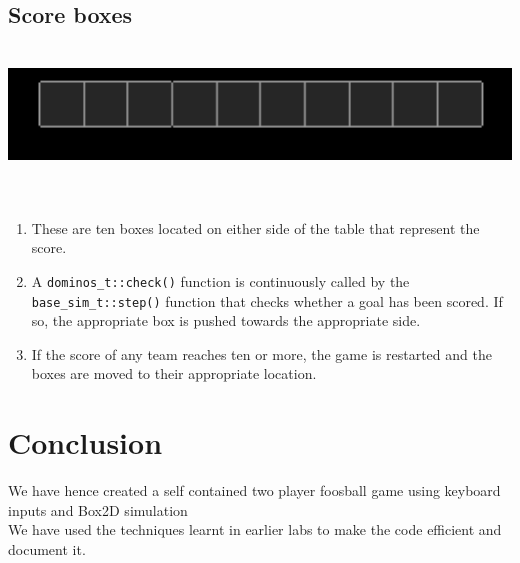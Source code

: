 \documentclass{article}
\begin{document}
\subsection{Score boxes}
\begin{center}
\includegraphics[width=400pt,height=100pt]{Scores}~\\
\end{center}
\begin{enumerate}
\item These are ten boxes located on either side of the table that represent the score.
\item A \texttt{dominos\_t::check()} function is continuously called by the \texttt{base\_sim\_t::step()} function that checks whether a goal has been scored. If so, the appropriate box is pushed towards the appropriate side.
\item If the score of any team reaches ten or more, the game is restarted and the boxes are moved to their appropriate location.\\

\end{enumerate}

\section{Conclusion}
We have hence created a self contained two player foosball game using keyboard inputs and Box2D simulation\\
We have used the techniques learnt in earlier labs to make the code efficient and document it. \\


\end{document}
